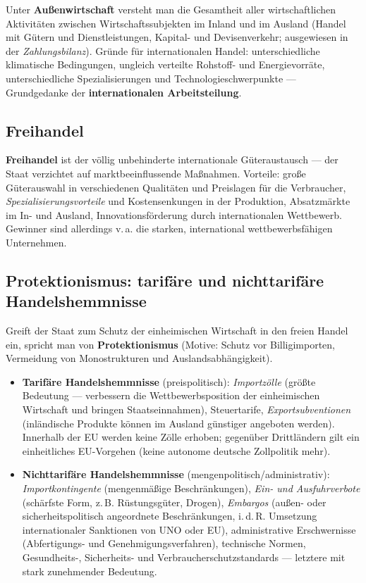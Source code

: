 \documentclass[11pt, a4paper]{article}
\begin{document}
Unter \textbf{Außenwirtschaft} versteht man die Gesamtheit aller wirtschaftlichen
Aktivitäten zwischen Wirtschaftssubjekten im Inland und im Ausland (Handel mit Gütern und
Dienstleistungen, Kapital- und Devisenverkehr; ausgewiesen in der \emph{Zahlungsbilanz}).
Gründe für internationalen Handel: unterschiedliche klimatische Bedingungen, ungleich
verteilte Rohstoff- und Energievorräte, unterschiedliche Spezialisierungen und
Technologieschwerpunkte --- Grundgedanke der \textbf{internationalen Arbeitsteilung}.

\subsection{Freihandel}

\textbf{Freihandel} ist der völlig unbehinderte internationale Güteraustausch --- der Staat
verzichtet auf marktbeeinflussende Maßnahmen. Vorteile: große Güterauswahl in verschiedenen
Qualitäten und Preislagen für die Verbraucher, \emph{Spezialisierungsvorteile} und
Kostensenkungen in der Produktion, Absatzmärkte im In- und Ausland, Innovationsförderung
durch internationalen Wettbewerb. Gewinner sind allerdings v.\,a. die starken,
international wettbewerbsfähigen Unternehmen.

\subsection{Protektionismus: tarifäre und nichttarifäre Handelshemmnisse}

Greift der Staat zum Schutz der einheimischen Wirtschaft in den freien Handel ein, spricht
man von \textbf{Protektionismus} (Motive: Schutz vor Billigimporten, Vermeidung von
Monostrukturen und Auslandsabhängigkeit).

\begin{itemize}
  \item \textbf{Tarifäre Handelshemmnisse} (preispolitisch): \emph{Importzölle} (größte
    Bedeutung --- verbessern die Wettbewerbsposition der einheimischen Wirtschaft und
    bringen Staatseinnahmen), Steuertarife, \emph{Exportsubventionen} (inländische Produkte
    können im Ausland günstiger angeboten werden). Innerhalb der EU werden keine Zölle
    erhoben; gegenüber Drittländern gilt ein einheitliches EU-Vorgehen (keine autonome
    deutsche Zollpolitik mehr).
  \item \textbf{Nichttarifäre Handelshemmnisse} (mengenpolitisch/administrativ):
    \emph{Importkontingente} (mengenmäßige Beschränkungen), \emph{Ein- und Ausfuhrverbote}
    (schärfste Form, z.\,B. Rüstungsgüter, Drogen), \emph{Embargos} (außen- oder
    sicherheitspolitisch angeordnete Beschränkungen, i.\,d.\,R. Umsetzung internationaler
    Sanktionen von UNO oder EU), administrative Erschwernisse (Abfertigungs- und
    Genehmigungsverfahren), technische Normen, Gesundheits-, Sicherheits- und
    Verbraucherschutzstandards --- letztere mit stark zunehmender Bedeutung.
\end{itemize}
\end{document}
